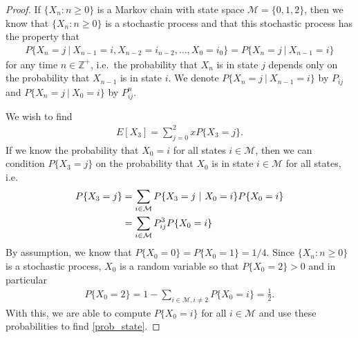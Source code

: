 \begin{proof}
  If $\{X_n: n \geq 0\}$ is a Markov chain with state space $\mathcal{M}=\{0, 1, 2\}$,
  then we know that $\{X_n: n \geq 0\}$ is a stochastic process and that
  this stochastic process has the property that
  \begin{align*}
    P\{X_{n} = j\ |\ X_{n-1} = i, X_{n-2} =i_{n-2}, \dots, X_0 = i_0\} = P\{X_{n}=j\ |\ X_{n-1} = i\}
  \end{align*}
  for any time $n\in\mathbb{Z}^+$, i.e.\ the probability that $X_{n}$ is in state $j$
  depends only on the probability that $X_{n-1}$ is in state $i$.
  We denote $P\{X_{n}=j\ |\ X_{n-1} = i\}$ by $P_{ij}$ and $P\{X_{n}=j\ |\ X_{0} = i\}$ by $P_{ij}^n$.

  We wish to find
  \begin{align*}
    E[X_3] = \sum_{j=0}^2 x P\{X_3 = j\}.
  \end{align*}
  If we know the probability that $X_0 = i$ for all states $i\in\mathcal{M}$,
  then we can condition $P\{X_3 = j\}$ on the probability that $X_0$ is in state $i\in\mathcal{M}$ for all states, i.e.\
  \begin{align}\label{prob_state}
    P\{X_3 = j\} &= \sum_{i\in\mathcal{M}} P\{X_3 = j \ |\ X_0 = i\} P\{X_0 = i\} \notag \\
    &= \sum_{i\in\mathcal{M}} P_{ij}^3 P\{X_0 = i\}
  \end{align}
  By assumption, we know that $P\{X_0 = 0\} = P\{X_0 = 1\} = 1/4$.
  Since $\{X_n: n \geq 0\}$ is a stochastic process, $X_0$ is
  a random variable so that $P\{X_0 = 2\} > 0$ and in particular
  \begin{align*}
    P\{X_0 = 2\} = 1 - \sum_{i\in\mathcal{M}, i\neq 2}P\{X_0 = i\} = \frac{1}{2}.
  \end{align*}
  With this, we are able to compute $P\{X_0 = i\}$ for all $i\in\mathcal{M}$ and use these
  probabilities to find \eqref{prob_state}.


\end{proof}
